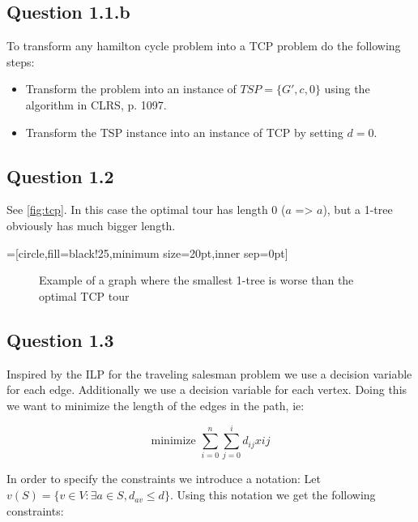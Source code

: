 \documentclass{sig-alternate}
\begin{document}
\subsection*{Question 1.1.b}
To transform any hamilton cycle problem into a TCP problem do the following
steps:

\begin{itemize}
\item Transform the problem into an instance of $TSP = \{G', c, 0\}$ using
    the algorithm in CLRS, p. 1097.
\item Transform the TSP instance into an instance of TCP by setting $d = 0$.
\end{itemize}

\subsection*{Question 1.2}
See \autoref{fig:tcp}. In this case the optimal tour has length $0$ ($a$ =>
$a$), but a 1-tree obviously has much bigger length.

=[circle,fill=black!25,minimum size=20pt,inner sep=0pt]
\begin{figure}
\begin{center}
\end{center}
\caption{Example of a graph where the smallest 1-tree is worse than the
    optimal TCP tour}
\label{fig:tcp}
\end{figure}

\subsection*{Question 1.3}
Inspired by the ILP for the traveling salesman problem we use a decision
variable for each edge. Additionally we use a decision variable for each
vertex. Doing this we want to minimize the length of the edges in the path,
ie:

\begin{equation}
    \text{minimize } \sum_{i=0}^{n}\sum_{j=0}^{i} d_{ij}x{ij}
\end{equation}

In order to specify the constraints we introduce a notation: Let $v(S) =
\{v\in V : \exists a\in S, d_{av} \le d\}$.
Using this notation we get the following constraints:
\end{document}
